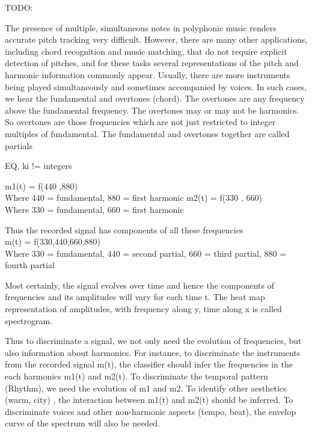 {\color{gray}

TODO:

The presence of multiple, simultaneous notes in polyphonic music renders accurate pitch tracking very difficult. However, there are many other applications, including chord recognition and music matching, that do not require explicit detection of pitches, and for these tasks several representations of the pitch and harmonic information commonly appear. Usually, there are more instruments being played simultaneously and sometimes accompanied by voices. In such cases, we hear the fundamental and overtones (chord). The overtones are any frequency above the fundamental frequency.  The overtones may or may not be harmonics. So overtones are those frequencies which are not just restricted to integer multiples of fundamental. The fundamental and overtones together are called partials

EQ, ki != integers

m1(t) = f(440 ,880) \\
   Where 440 = fundamental, 880 = first harmonic
m2(t) = f(330 , 660)\\
   Where 330 = fundamental, 660 = first harmonic
   
Thus the recorded signal has components of all these frequencies\\
  m(t) = f(330,440,660,880)\\
  Where 330 = fundamental, 440 = second partial, 660 = third partial, 880 = fourth partial
  
Most certainly, the signal evolves over time and hence the components of frequencies and its amplitudes will vary for each time t. The heat map representation of amplitudes, with frequency along y, time along   x is called spectrogram. 

Thus to discriminate a signal, we not only need the evolution of frequencies, but also information about harmonics. For instance, to discriminate the instruments from the recorded signal m(t), the classifier should infer the frequencies in the each harmonics m1(t) and m2(t). To discriminate the temporal pattern (Rhythm), we need the evolution of m1 and m2. To identify other aesthetics (warm, city) , the interaction between m1(t) and m2(t) should be inferred. To discriminate voices and other non-harmonic aspects (tempo, beat), the envelop curve of the spectrum will also be needed. 
}


